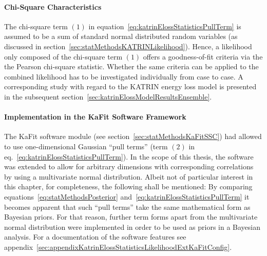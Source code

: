 \paragraph{Chi-Square Characteristics}
The chi-square term $(1)$ in equation~\eqref{eq:katrinElossStatisticsPullTerm} is assumed to be a sum of standard normal distributed random variables (as discussed in section~\ref{sec:statMethodsKATRINLikelihood}). Hence, a likelihood only composed of the chi-square term $(1)$ offers a goodness-of-fit criteria via the the Pearson chi-square statistic. Whether the same criteria can be applied to the combined likelihood has to be investigated individually from case to case. A corresponding study with regard to the KATRIN energy loss model is presented in the subsequent section~\ref{sec:katrinElossModelResultsEnsemble}.

\paragraph{Implementation in the KaFit Software Framework}
The KaFit software module (see section~\ref{sec:statMethodsKaFitSSC}) had allowed to use one-dimensional Gaussian ``pull terms'' (term $(2)$ in eq.~\ref{eq:katrinElossStatisticsPullTerm}). In the scope of this thesis, the software was extended to allow for arbitrary dimensions with corresponding correlations by using a multivariate normal distribution. Albeit not of particular interest in this chapter, for completeness, the following shall be mentioned: By comparing equations~\eqref{eq:statMethodsPosterior} and~\eqref{eq:katrinElossStatisticsPullTerm} it becomes apparent that such ``pull terms'' take the same mathematical form as Bayesian priors. For that reason, further term forms apart from the multivariate normal distribution were implemented in order to be used as priors in a Bayesian analysis. For a documentation of the software features see appendix~\ref{sec:appendixKatrinElossStatisticsLikelihoodExtKaFitConfig}.


